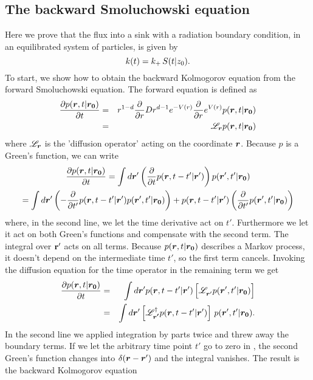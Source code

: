 \subsection{ The backward Smoluchowski equation}
Here we prove that the flux into a sink with a radiation boundary condition, in an equilibrated system of particles, is given by
\begin{equation}
 k(t) = k_+ \, S(t|z_0).
 \elabel{bsm_k}
\end{equation}
To start, we show how to obtain the backward Kolmogorov equation from the forward Smoluchowski equation. The forward equation is defined as
\begin{eqnarray}
 \frac{\partial p(\boldsymbol{r},t|\boldsymbol{r_0})}{\partial t} & = & r^{1-d} \frac{\partial }{\partial r} D r^{d-1} e^{-V(r)} \frac{\partial }{\partial r} e^{V(r)} p(\boldsymbol{r},t|\boldsymbol{r_0}) \\
 & = & \mathscr{L}_{\boldsymbol{r}} p(\boldsymbol{r},t|\boldsymbol{r_0})
\end{eqnarray}
where $\mathscr{L}_{\boldsymbol{r}}$ is the 'diffusion operator' acting on the coordinate $\boldsymbol{r}$. Because $p$ is a Green's function, we can write
\begin{multline}
\frac{\partial p(\boldsymbol{r},t|\boldsymbol{r_0})}{\partial t} = \int d\boldsymbol{r}' \left(\frac{\partial }{\partial t} p(\boldsymbol{r},t-t'|\boldsymbol{r}') \right) p(\boldsymbol{r}',t'|\boldsymbol{r_0}) \\
 = \int d\boldsymbol{r}' \left( - \frac{\partial }{\partial t'} p(\boldsymbol{r},t - t'|\boldsymbol{r}') p(\boldsymbol{r}',t'|\boldsymbol{r_0}) \right) + p(\boldsymbol{r},t - t'|\boldsymbol{r}') \left( \frac{\partial }{\partial t'} p(\boldsymbol{r}',t'|\boldsymbol{r_0}) \right) 
\end{multline}
where, in the second line, we let the time derivative act on $t'$. Furthermore we let it act on both Green's functions and compensate with the second term. The integral over ${\bf r'}$ acts on all terms. Because $p(\boldsymbol{r},t|\boldsymbol{r_0})$ describes a Markov process, it doesn't depend on the intermediate time $t'$, so the first term cancels. Invoking the diffusion equation for the time operator in the remaining term we get
\begin{eqnarray}
 \pdiff{p(\vect{r},t|\vect{r_0})}{t} & = & \int d\vect{r}' p(\vect{r},t - t'|\vect{r}') \left[ \mathscr{L}_{\vect{r}'}^{\phantom{\dag}} p(\vect{r}',t'|\vect{r_0}) \right] \\
 & = & \int d\vect{r}' \left[ \mathscr{L}_{\vect{r'}}^{\dag} p(\vect{r},t - t'|\vect{r}') \right] \, p(\vect{r}',t'|\vect{r_0}). \elabel{bsm_1}
\end{eqnarray}
In the second line we applied integration by parts twice and threw away the boundary terms. If we let the arbitrary time point $t'$ go to zero in , the second Green's function changes into $\delta(\boldsymbol{r}-\boldsymbol{r}')$ and the integral vanishes. The result is the backward Kolmogorov equation
